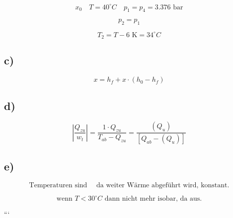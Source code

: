 \[
x_0 \quad T = 40^\circ C \quad p_1 = p_4 = 3.376 \text{ bar}
\]

\[
p_2 = p_1
\]

\[
T_2 = T - 6 \text{ K} = 34^\circ C
\]

\subsection*{c)}

\[
x = h_f + x \cdot (h_0 - h_f)
\]

\subsection*{d)}

\[
\left| \frac{Q_{zu}}{w_t} \right| = \frac{1 \cdot Q_{zu}}{T_{ab} - Q_{zu}} = \frac{(Q_{u})}{[Q_{ab} - (Q_{u})]}
\]

\subsection*{e)}

\[
\text{Temperaturen sind } \quad \text{da weiter Wärme abgeführt wird, konstant.}
\]

\[
\text{wenn } T < 30^\circ C \text{ dann nicht mehr isobar, da aus.}
\]

```